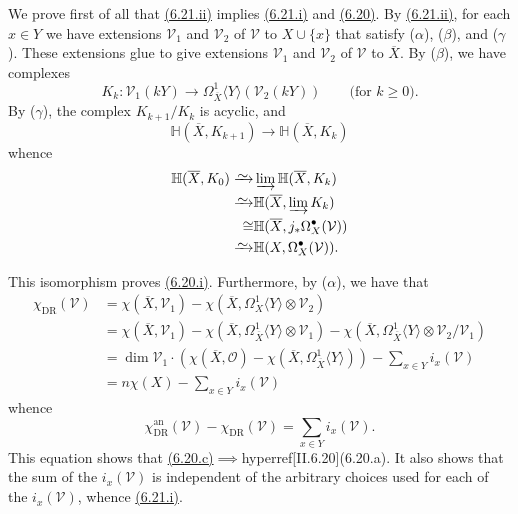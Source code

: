 \documentclass{report}
\renewcommand{\cal}[1]{{\mathcal{#1}}}
\newcommand{\an}{\mathrm{an}}
\newcommand{\simto}{\xrightarrow{\raisebox{-0.7ex}[0ex][0ex]{$\sim$}}}
\renewcommand{\geq}{\geqslant}
\newcommand{\oldpage}[1]{\marginpar{\footnotesize$\Big\vert$ \textit{p.~#1}}}
\begin{document}
We prove first of all that \hyperref[II.6.21]{(6.21.ii)} implies \hyperref[II.6.21]{(6.21.i)} and \hyperref[II.6.20]{(6.20)}.
By \hyperref[II.6.21]{(6.21.ii)}, for each $x\in Y$ we have extensions $\cal{V}_1$ and $\cal{V}_2$ of $\cal{V}$ to $X\cup\{x\}$ that satisfy ($\alpha$), ($\beta$), and ($\gamma$).
These extensions glue to give extensions $\cal{V}_1$ and $\cal{V}_2$ of $\cal{V}$ to $\overline{X}$.
By ($\beta$), we have complexes
\[
  K_k\colon \cal{V}_1(kY) \to \Omega_{\overline{X}}^1\langle Y\rangle(\cal{V}_2(kY))
  \qquad\mbox{(for $k\geq0$).}
\]
By ($\gamma$), the complex $K_{k+1}/K_k$ is acyclic, and
\[
  \mathbb{H}(\overline{X},K_{k+1}) \to \mathbb{H}(\overline{X},K_k)
\]
whence
\oldpage{111}
\[
  \begin{aligned}
    \mathbb{H}(\overline{X},K_0)
    \simto& \varinjlim\mathbb{H}(\overline{X},K_k)
  \\\simto& \mathbb{H}(\overline{X},\varinjlim K_k)
  \\\cong& \mathbb{H}(\overline{X},j_*\Omega_X^\bullet(\cal{V}))
  \\\simto& \mathbb{H}(X,\Omega_X^\bullet(\cal{V})).
  \end{aligned}
\]

This isomorphism proves \hyperref[II.6.20]{(6.20.i)}.
Furthermore, by ($\alpha$), we have that
\[
  \begin{aligned}
    \chi_\mathrm{DR}(\cal{V})
    &= \chi(\overline{X},\cal{V}_1) - \chi(\overline{X},\Omega_X^1\langle Y\rangle\otimes\cal{V}_2)
  \\&= \chi(\overline{X},\cal{V}_1) - \chi(\overline{X},\Omega_{\overline{X}}^1\langle Y\rangle\otimes\cal{V}_1) - \chi(\overline{X},\Omega_{\overline{X}}^1\langle Y\rangle\otimes\cal{V}_2/\cal{V}_1)
  \\&= \dim\cal{V}_1\cdot(\chi(\overline{X},\cal{O}) - \chi(\overline{X},\Omega_{\overline{X}}^1\langle Y\rangle)) - \sum_{x\in Y} i_x(\cal{V})
  \\&= n\chi(X) - \sum_{x\in Y} i_x(\cal{V})
  \end{aligned}
\]
whence
\[
\label{II.6.21.1}
  \chi_\mathrm{DR}^\an(\cal{V}) - \chi_\mathrm{DR}(\cal{V})
  = \sum_{x\in Y} i_x(\cal{V}).
\tag{6.21.1}
\]
This equation shows that \hyperref[II.6.20]{(6.20.c)}$\implies$hyperref[II.6.20]{(6.20.a)}.
It also shows that the sum of the $i_x(\cal{V})$ is independent of the arbitrary choices used for each of the $i_x(\cal{V})$, whence \hyperref[II.6.21]{(6.21.i)}.
\end{document}
